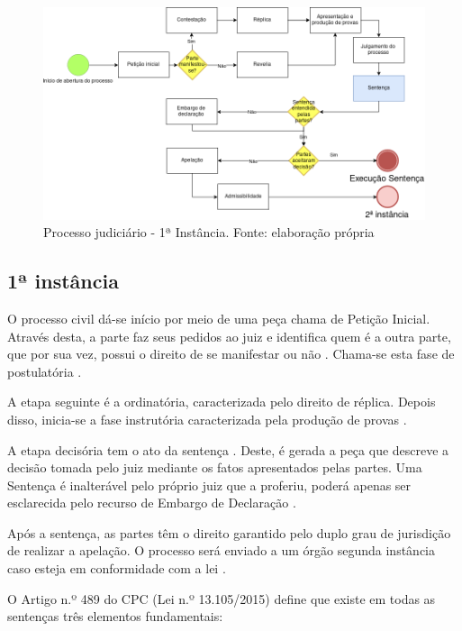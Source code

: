 \begin{figure}[h]
	\centering
    \includegraphics[keepaspectratio=true,scale=0.4]{figuras/processoPrimeira}
	\caption[Processo judiciário - 1ª Instância]{Processo judiciário - 1ª Instância. Fonte: elaboração própria}
	\label{fig:processoPrimeira}
\end{figure}

\subsection{1ª instância}

O processo civil dá-se início por meio de uma peça chama de Petição Inicial. Através desta, a parte faz seus pedidos ao juiz e identifica quem é a outra parte, que por sua vez, possui o direito de se manifestar ou não \cite{BRASIL2015}. Chama-se esta fase de postulatória \cite{GONCALVES2016}.

A etapa seguinte é a ordinatória, caracterizada pelo direito de réplica. Depois disso, inicia-se a fase instrutória caracterizada pela produção de provas \cite{GONCALVES2016}.

A etapa decisória tem o ato da sentença \cite{GONCALVES2016}. Deste, é gerada a peça que descreve a decisão tomada pelo juiz mediante os fatos apresentados pelas partes. Uma Sentença é inalterável pelo próprio juiz que a proferiu, poderá apenas ser esclarecida pelo recurso de Embargo de Declaração \cite{BRASIL2015}.

Após a sentença, as partes têm o direito garantido pelo duplo grau de jurisdição de realizar a apelação. O processo será enviado a um órgão segunda instância caso esteja em conformidade com a lei \cite{GONCALVES2016}.

O Artigo n.º 489 do CPC (Lei n.º 13.105/2015) define que existe em todas as sentenças três elementos fundamentais:


